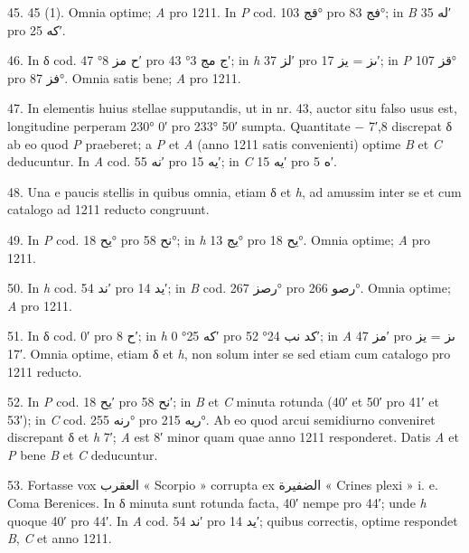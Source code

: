 \documentclass[11pt]{article}
\newcommand{\AbjadZero}{{\NallinoSigns\symbol{"E000}}}
\begin{document}
{\small
\par\hangindent=12mm 45. 45 (1). Omnia optime; \textit{A} pro 1211. In \textit{P} cod. \textarabic{قج} 103° pro \textarabic{فج} 83°; in \textit{B} \textarabic{له} 35′ pro \textarabic{كه} 25′.
\par\hangindent=12mm 46. In δ cod. \textarabic{ح مز} 8° 47′ pro \textarabic{ج مج} 3° 43′; in \textit{h} \textarabic{لز} 37′ pro \textarabic{ىز} = \textarabic{يز} 17′; in \textit{P} \textarabic{قز} 107° pro \textarabic{فز} 87°. Omnia satis bene; \textit{A} pro 1211.
\par\hangindent=12mm 47. In elementis huius stellae supputandis, ut in nr. 43, auctor situ falso usus est, longitudine perperam 230° 0′ pro 233° 50′ sumpta. Quantitate − 7′,8 discrepat δ ab eo quod \textit{P} praeberet; a \textit{P} et \textit{A} (anno 1211 satis convenienti) optime \textit{B} et \textit{C} deducuntur. In \textit{A} cod. \textarabic{نه} 55′ pro \textarabic{يه} 15′; in \textit{C} \textarabic{يه} 15′ pro \textarabic{ه} 5′.
\par\hangindent=12mm 48. Una e paucis stellis in quibus omnia, etiam δ et \textit{h}, ad amussim inter se et cum catalogo ad 1211 reducto congruunt.
\par\hangindent=12mm 49. In \textit{P} cod. \textarabic{يح} 18° pro \textarabic{نح} 58°; in \textit{h} \textarabic{يج} 13° pro \textarabic{يح} 18°. Omnia optime; \textit{A} pro 1211.
\par\hangindent=12mm 50. In \textit{h} cod. \textarabic{ند} 54′ pro \textarabic{يد} 14′; in \textit{B} cod. \textarabic{رصز} 267° pro \textarabic{رصو} 266°. Omnia optime; \textit{A} pro 1211.
\par\hangindent=12mm 51. In δ cod. \textarabic{\AbjadZero{}} 0′ pro \textarabic{ح} 8′; in \textit{h} \textarabic{\AbjadZero{} كه} 25° 0′ pro \textarabic{كد نب} 24° 52′; in \textit{A} \textarabic{مز} 47′ pro \textarabic{ىز} = \textarabic{يز} 17′. Omnia optime, etiam δ et \textit{h}, non solum inter se sed etiam cum catalogo pro 1211 reducto.
\par\hangindent=12mm 52. In \textit{P} cod. \textarabic{يح} 18′ pro \textarabic{نح} 58′; in \textit{B} et \textit{C} minuta rotunda (40′ et 50′ pro 41′ et 53′); in \textit{C} cod. \textarabic{رنه} 255° pro \textarabic{ريه} 215°. Ab eo quod arcui semidiurno conveniret discrepant δ et \textit{h} 7′; \textit{A} est 8′ minor quam quae anno 1211 responderet. Datis \textit{A} et \textit{P} bene \textit{B} et \textit{C} deducuntur.
\par\hangindent=12mm 53. Fortasse vox \textarabic{العقرب} « Scorpio » corrupta ex \textarabic{الضفيرة} « Crines plexi » i. e. Coma Berenices. In δ minuta sunt rotunda facta, 40′ nempe pro 44′; unde \textit{h} quoque 40′ pro 44′. In \textit{A} cod. \textarabic{ند} 54′ pro \textarabic{يد} 14′; quibus correctis, optime respondet \textit{B}, \textit{C} et anno 1211.
\par}
\end{document}
